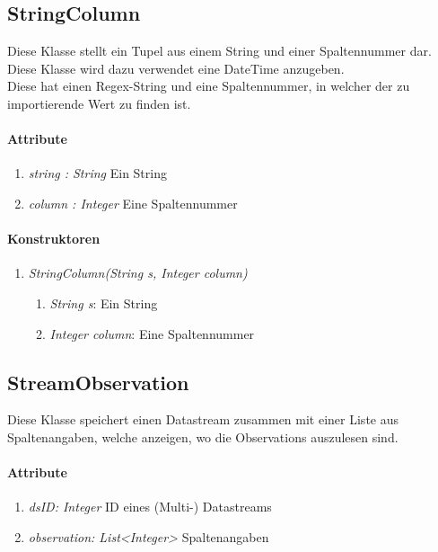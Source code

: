 \subsection{StringColumn}
Diese Klasse stellt ein Tupel aus einem String und einer Spaltennummer dar.
Diese Klasse wird dazu verwendet eine DateTime anzugeben. \\Diese hat einen Regex-String und eine Spaltennummer, in welcher der zu importierende Wert zu finden ist.
\paragraph{Attribute}
\begin{enumerate}[-]
	\item \textit{string : String} Ein String
	\item \textit{column : Integer} Eine Spaltennummer
\end{enumerate} 

\paragraph{Konstruktoren}
\begin{enumerate}[+]
	\item \textit{StringColumn(String s, Integer column)} \\
	
	\begin{enumerate}[$\bullet$]
		\item \textit{String s}: Ein String
		\item \textit{Integer column}: Eine Spaltennummer
	\end{enumerate}
\end{enumerate}







\subsection{StreamObservation}
Diese Klasse speichert einen Datastream zusammen mit einer Liste aus Spaltenangaben, welche anzeigen, wo die Observations auszulesen sind.
\paragraph{Attribute} 
\begin{enumerate}[-]
	\item \textit{dsID: Integer} ID eines (Multi-) Datastreams
	\item \textit{observation: List<Integer>} Spaltenangaben
\end{enumerate}

